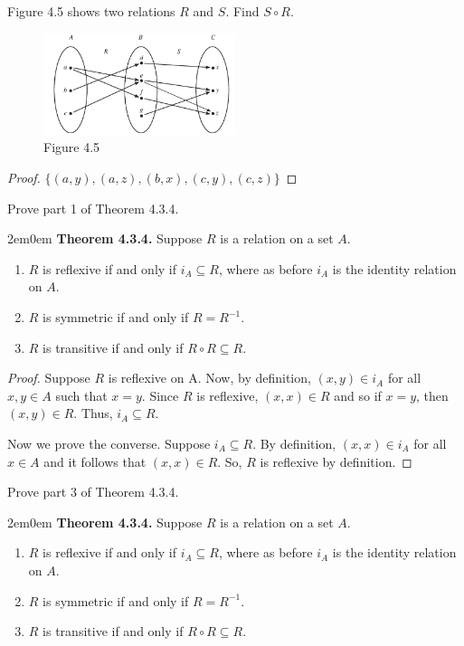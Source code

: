 \documentclass[12pt]{article}
\newenvironment{exercise}[2][Exercise]{\begin{trivlist}
\item[\hskip \labelsep {\bfseries #1}\hskip \labelsep {\bfseries #2.}]}{\end{trivlist}}
\newenvironment{aw}
  {\begin{adjustwidth}{2em}{0em}}
  {\end{adjustwidth}}
\begin{document}
\begin{exercise}
	{5}
	Figure 4.5 shows two relations \( R \) and \( S \). Find \( S \circ R \).
	\begin{figure}[H]
		\centering
		\includegraphics[width=0.5\textwidth]{figure4.5.png}
		\caption*{Figure 4.5}
	\end{figure}
\end{exercise}

\begin{proof}
	$\{(a,y),(a,z),(b,x),(c,y),(c,z)\}$
\end{proof}

\begin{exercise}
	{7}
	Prove part 1 of Theorem 4.3.4.
	\begin{aw}
		\textbf{Theorem 4.3.4.} Suppose \( R \) is a relation on a set \( A \).
		\begin{enumerate}
			\item \( R \) is reflexive if and only if \( i_A \subseteq R \), where as before \( i_A \) is the identity relation on \( A \).
			\item \( R \) is symmetric if and only if \( R = R^{-1} \).
			\item \( R \) is transitive if and only if \( R \circ R \subseteq R \).
		\end{enumerate}
	\end{aw}
\end{exercise}

\begin{proof}
	Suppose $R$ is reflexive on A. Now, by definition, $(x,y)\in i_A$ for all $x,y\in A$ such that $x=y$. Since $R$ is reflexive, $(x,x)\in R$ and so if $x=y$, then $(x,y)\in R$. Thus, $i_A\subseteq R$.
	
	Now we prove the converse. Suppose $i_A\subseteq R$. By definition, $(x,x)\in i_A$ for all $x\in A$ and it follows that $(x,x)\in R$. So, $R$ is reflexive by definition. 
\end{proof}

\begin{exercise}
	{8}
	Prove part 3 of Theorem 4.3.4.
	\begin{aw}
		\textbf{Theorem 4.3.4.} Suppose \( R \) is a relation on a set \( A \).
		\begin{enumerate}
			\item \( R \) is reflexive if and only if \( i_A \subseteq R \), where as before \( i_A \) is the identity relation on \( A \).
			\item \( R \) is symmetric if and only if \( R = R^{-1} \).
			\item \( R \) is transitive if and only if \( R \circ R \subseteq R \).
		\end{enumerate}
	\end{aw}
\end{exercise}
\end{document}
